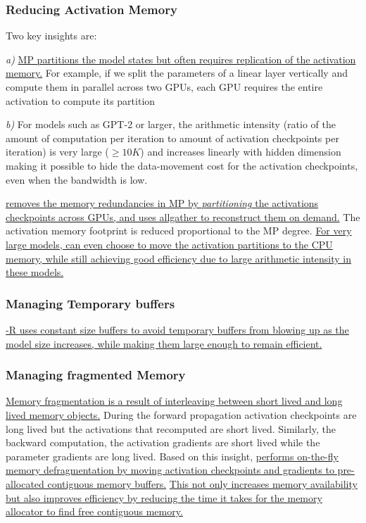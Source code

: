 \label{sec:mp_activation_replication}
\subsubsection{Reducing Activation Memory}

Two key insights are:

{\it a)} \uline{MP partitions the model states but often requires replication of the activation memory.} For example, if we split the parameters of a linear layer vertically and compute them in parallel across two GPUs, each GPU requires the entire activation to compute its partition

{\it b)} For models such as GPT-2 or larger, the arithmetic intensity (ratio of the amount of computation per iteration to amount of activation checkpoints per iteration) is very large ($\ge 10K$) and increases linearly with hidden dimension making it possible to hide the data-movement cost for the activation checkpoints, even when the bandwidth is low.

\uline{\name removes the memory redundancies in MP by \emph{partitioning} the activations checkpoints across GPUs, and uses allgather to reconstruct them on demand.} The activation memory footprint is reduced proportional to the MP degree. \uline{For very large models, \name can even choose to move the activation partitions to the CPU memory, while still achieving good efficiency due to large arithmetic intensity in these models.}

\subsubsection{Managing Temporary buffers}

\uline{\name-R uses constant size buffers to avoid temporary buffers from blowing up as the model size increases, while making them large enough to remain efficient.}

\subsubsection{Managing fragmented Memory}

\uline{Memory fragmentation is a result of interleaving between short lived and long lived memory objects.} During the forward propagation activation checkpoints are long lived but the activations that recomputed are short lived. Similarly, the backward computation, the activation gradients are short lived while the parameter gradients are long lived. Based on this insight, \uline{\name performs on-the-fly memory defragmentation by moving activation checkpoints and gradients to pre-allocated contiguous memory buffers.} \uline{This not only increases memory availability but also improves efficiency by reducing the time it takes for the memory allocator to find free contiguous memory.}